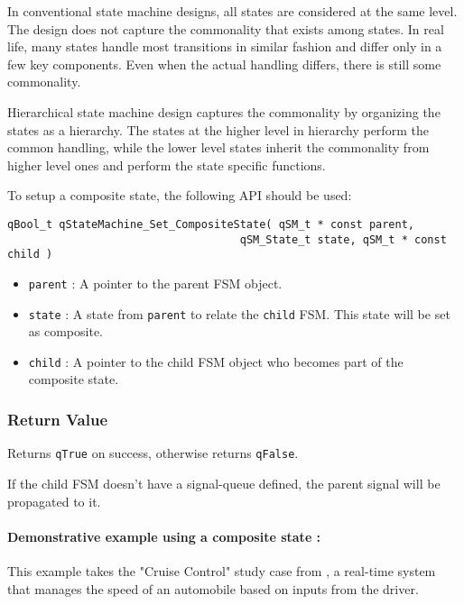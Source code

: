 In conventional state machine designs, all states are considered at the same level. The design does not capture the commonality that exists among states. In real life, many states handle most transitions in similar fashion and differ only in a few key components. Even when the actual handling differs, there is still some commonality.

Hierarchical state machine design captures the commonality by organizing the states as a hierarchy. The states at the higher level in hierarchy perform the common handling, while the lower level states inherit the commonality from higher level ones and perform the state specific functions. 

To setup a composite state, the following API should be used:
\medskip

\begin{lstlisting}[style=CStyle]
qBool_t qStateMachine_Set_CompositeState( qSM_t * const parent, 
                                    qSM_State_t state, qSM_t * const child )
\end{lstlisting}

\begin{itemize}
    \item \lstinline{parent} : A pointer to the parent FSM object.
    \item \lstinline{state} : A state from \lstinline{parent} to relate the \lstinline{child} FSM. This state will be set as composite.
    \item \lstinline{child} : A pointer to the child FSM object who becomes part of the composite state.
\end{itemize}

\subsubsection*{Return Value}
Returns \lstinline{qTrue} on success, otherwise returns \lstinline{qFalse}.

\hrulefill
\medskip

\begin{tcolorbox}
\HandRight If the child FSM doesn't have a signal-queue defined, the parent signal will be propagated to it.
\end{tcolorbox}


\paragraph{Demonstrative example using a composite state :} This example takes the "Cruise Control" study case from \cite{gomaa}, a real-time system that manages the speed of an automobile based on inputs from the driver. 


